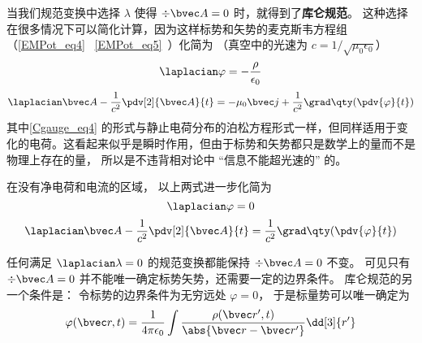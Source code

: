
\begin{issues}
\issueDraft
\end{issues}


当我们规范变换中选择 $\lambda$ 使得 $\div \bvec A = 0$ 时，就得到了\textbf{库仑规范}。 这种选择在很多情况下可以简化计算，因为这样标势和矢势的麦克斯韦方程组（\autoref{EMPot_eq4}~ \autoref{EMPot_eq5}~）化简为 （真空中的光速为 $c = 1/\sqrt{\mu_0\epsilon_0}$）%
\begin{equation}\label{Cgauge_eq4}
\laplacian \varphi = -\frac{\rho}{\epsilon_0}
\end{equation}
\begin{equation}\label{Cgauge_eq3}
\laplacian \bvec A - \frac{1}{c^2} \pdv[2]{\bvec A}{t} = -\mu_0\bvec j + \frac{1}{c^2} \grad\qty(\pdv{\varphi}{t})
\end{equation}
其中\autoref{Cgauge_eq4} 的形式与静止电荷分布的泊松方程形式一样，但同样适用于变化的电荷。这看起来似乎是瞬时作用，但由于标势和矢势都只是数学上的量而不是物理上存在的量， 所以是不违背相对论中 “信息不能超光速的” 的。

在没有净电荷和电流的区域， 以上两式进一步化简为
\begin{equation}
\laplacian \varphi = 0
\end{equation}
\begin{equation}
\laplacian \bvec A - \frac{1}{c^2}\pdv[2]{\bvec A}{t} = \frac{1}{c^2} \grad\qty(\pdv{\varphi}{t})
\end{equation}

任何满足 $\laplacian \lambda = 0$ 的规范变换都能保持 $\div \bvec A = 0$ 不变。 可见只有 $\div \bvec A = 0$ 并不能唯一确定标势矢势，还需要一定的边界条件。 库仑规范的另一个条件是： 令标势的边界条件为无穷远处 $\varphi = 0$， 于是标量势可以唯一确定为
\begin{equation}\label{Cgauge_eq1}
\varphi(\bvec r, t) = \frac{1}{4\pi\epsilon_0} \int \frac{\rho(\bvec r', t)}{\abs{\bvec r - \bvec r'}} \dd[3]{r'}
\end{equation}

